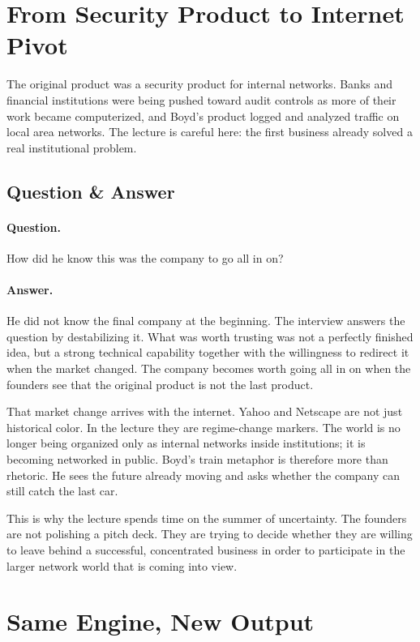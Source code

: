 \section{From Security Product to Internet Pivot}

The original product was a security product for internal networks. Banks and financial institutions were being pushed toward audit controls as more of their work became computerized, and Boyd's product logged and analyzed traffic on local area networks. The lecture is careful here: the first business already solved a real institutional problem.

\subsection{Question \& Answer}

\paragraph{Question.} How did he know this was the company to go all in on?

\paragraph{Answer.} He did not know the final company at the beginning. The interview answers the question by destabilizing it. What was worth trusting was not a perfectly finished idea, but a strong technical capability together with the willingness to redirect it when the market changed. The company becomes worth going all in on when the founders see that the original product is not the last product.

That market change arrives with the internet. Yahoo and Netscape are not just historical color. In the lecture they are regime-change markers. The world is no longer being organized only as internal networks inside institutions; it is becoming networked in public. Boyd's train metaphor is therefore more than rhetoric. He sees the future already moving and asks whether the company can still catch the last car.

This is why the lecture spends time on the summer of uncertainty. The founders are not polishing a pitch deck. They are trying to decide whether they are willing to leave behind a successful, concentrated business in order to participate in the larger network world that is coming into view.

\section{Same Engine, New Output}

